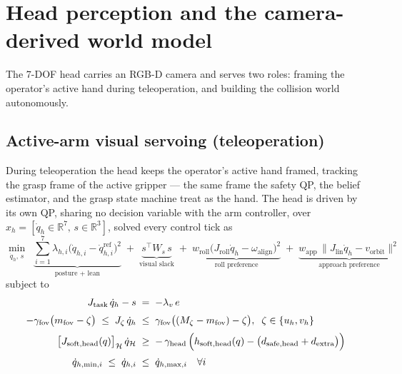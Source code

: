 \documentclass[12pt,a4paper,twoside,openright]{report}
\newcommand{\qdot}{\dot{q}}
\begin{document}
\section{Head perception and the camera-derived world model}
\label{sec:head}

The 7-DOF head carries an RGB-D camera and serves two roles: framing the operator's active hand during teleoperation, and building the collision world autonomously.

\subsection{Active-arm visual servoing (teleoperation)}
\label{sec:headtrack}

During teleoperation the head keeps the operator's active hand framed, tracking the grasp frame of the active gripper --- the same frame the safety QP, the belief estimator, and the grasp state machine treat as the hand. The head is driven by its own QP, sharing no decision variable with the arm controller, over $x_h = [\qdot_h \in \mathbb{R}^7,\, s \in \mathbb{R}^3]$, solved every control tick as
\begin{equation}
\label{eq:headqp}
\min_{\qdot_h,\,s} \;\;
\underbrace{\sum_{i=1}^{7}\lambda_{h,i}\bigl(\qdot_{h,i}-\qdot_{h,i}^{\text{ref}}\bigr)^2}_{\text{posture + lean}}
\;+\; \underbrace{s^{\top}W_s\,s}_{\text{visual slack}}
\;+\; \underbrace{w_{\text{roll}}\bigl(J_{\text{roll}}\qdot_h-\omega_{\text{align}}\bigr)^2}_{\text{roll preference}}
\;+\; \underbrace{w_{\text{app}}\,\|J_{\text{lin}}\qdot_h-v_{\text{orbit}}\|^2}_{\text{approach preference}}
\end{equation}
subject to
\begin{align}
J_{\text{task}}\,\qdot_h - s \;&=\; -\lambda_v\, e \label{eq:headtask}\\[2pt]
-\gamma_{\text{fov}}\bigl(m_{\text{fov}}-\zeta\bigr) \;\le\; J_{\zeta}\,\qdot_h \;&\le\; \gamma_{\text{fov}}\bigl((M_{\zeta}-m_{\text{fov}})-\zeta\bigr), \;\; \zeta \in \{u_h, v_h\} \label{eq:headfov}\\[2pt]
\bigl[J_{\text{soft},\text{head}}(q)\bigr]_{\mathcal{H}}\,\qdot_{\mathcal{H}} \;&\ge\; -\,\gamma_{\text{head}}\,\Bigl(h_{\text{soft},\text{head}}(q) - \bigl(d_{\text{safe},\text{head}} + d_{\text{extra}}\bigr)\Bigr) \label{eq:headcbf}\\[2pt]
\qdot_{h,\min,i} \;\le\; \qdot_{h,i} \;&\le\; \qdot_{h,\max,i} \quad \forall i \label{eq:headjl}
\end{align}
\end{document}
